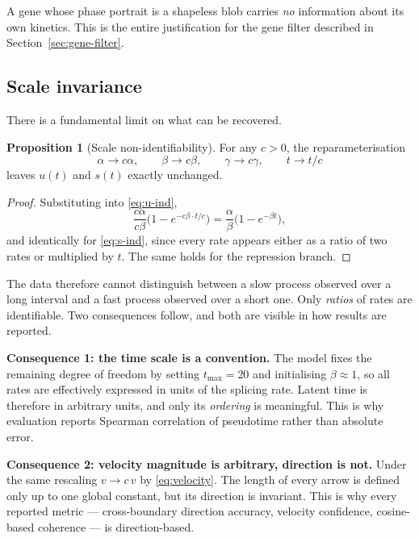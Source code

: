\documentclass[11pt,a4paper]{article}
\newenvironment{keybox}{\begin{shaded}\noindent}{\end{shaded}}
\newcommand{\uns}{u}
\newcommand{\spl}{s}
\newcommand{\tmax}{t_{\max}}
\theoremstyle{definition}
\newtheorem{prop}{Proposition}
\begin{document}
A gene whose phase portrait is a shapeless blob carries \emph{no} information
about its own kinetics. This is the entire justification for the gene filter
described in Section~\ref{sec:gene-filter}.

\subsection{Scale invariance}

There is a fundamental limit on what can be recovered.

\begin{prop}[Scale non-identifiability]
\label{prop:scale}
For any $c > 0$, the reparameterisation
\[
\alpha \to c\alpha, \qquad \beta \to c\beta, \qquad \gamma \to c\gamma,
\qquad t \to t/c
\]
leaves $\uns(t)$ and $\spl(t)$ exactly unchanged.
\end{prop}

\begin{proof}
Substituting into \eqref{eq:u-ind},
\[
\frac{c\alpha}{c\beta}\Big(1 - e^{-c\beta \cdot t/c}\Big)
= \frac{\alpha}{\beta}\Big(1 - e^{-\beta t}\Big),
\]
and identically for \eqref{eq:s-ind}, since every rate appears either as a
ratio of two rates or multiplied by $t$. The same holds for the repression
branch.
\end{proof}

The data therefore cannot distinguish between a slow process observed over a
long interval and a fast process observed over a short one. Only \emph{ratios}
of rates are identifiable. Two consequences follow, and both are visible in
how results are reported.

\begin{keybox}
\textbf{Consequence 1: the time scale is a convention.}
The model fixes the remaining degree of freedom by setting
$\tmax = 20$ and initialising $\beta \approx 1$, so all rates are effectively
expressed in units of the splicing rate. Latent time is therefore in arbitrary
units, and only its \emph{ordering} is meaningful. This is why evaluation
reports Spearman correlation of pseudotime rather than absolute error.

\medskip
\textbf{Consequence 2: velocity magnitude is arbitrary, direction is not.}
Under the same rescaling $v \to c\,v$ by \eqref{eq:velocity}. The length of
every arrow is defined only up to one global constant, but its direction is
invariant. This is why every reported metric --- cross-boundary direction
accuracy, velocity confidence, cosine-based coherence --- is direction-based.
\end{keybox}
\end{document}
